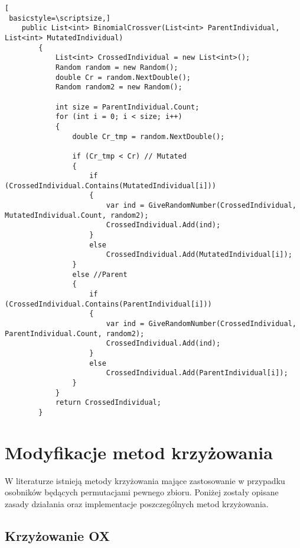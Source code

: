 \begin{program}[h!]
\begin{lstlisting}[
 basicstyle=\scriptsize,]
	public List<int> BinomialCrossver(List<int> ParentIndividual, List<int> MutatedIndividual)
        {
            List<int> CrossedIndividual = new List<int>();
            Random random = new Random();
            double Cr = random.NextDouble();
            Random random2 = new Random();

            int size = ParentIndividual.Count;
            for (int i = 0; i < size; i++)
            {
                double Cr_tmp = random.NextDouble();

                if (Cr_tmp < Cr) // Mutated
                {
                    if (CrossedIndividual.Contains(MutatedIndividual[i]))
                    {
                        var ind = GiveRandomNumber(CrossedIndividual, MutatedIndividual.Count, random2);
                        CrossedIndividual.Add(ind);
                    }
                    else
                        CrossedIndividual.Add(MutatedIndividual[i]);
                }
                else //Parent
                {
                    if (CrossedIndividual.Contains(ParentIndividual[i]))
                    {
                        var ind = GiveRandomNumber(CrossedIndividual, ParentIndividual.Count, random2);
                        CrossedIndividual.Add(ind);
                    }
                    else
                        CrossedIndividual.Add(ParentIndividual[i]);
                }
            }
            return CrossedIndividual;
        }
\end{lstlisting}
\end{program}


\section{Modyfikacje metod krzyżowania}\label{sec:strukturaDokumentu}

W literaturze \cite{crossovers} istnieją metody krzyżowania mające zastosowanie w przypadku osobników będących permutacjami pewnego zbioru. Poniżej zostały opisane zasady działania oraz implementacje poszczególnych metod krzyżowania.


\subsection{Krzyżowanie OX}\label{sec:kompilacja}

